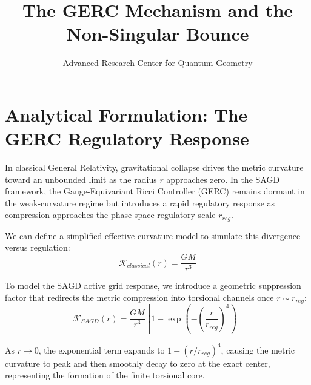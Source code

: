 \documentclass[12pt, a4paper]{article}
\title{\textbf{The GERC Mechanism and the Non-Singular Bounce}}
\author{Advanced Research Center for Quantum Geometry}
\date{}
\begin{document}
\maketitle

\section*{Analytical Formulation: The GERC Regulatory Response}

In classical General Relativity, gravitational collapse drives the metric curvature toward an unbounded limit as the radius $r$ approaches zero. In the SAGD framework, the Gauge-Equivariant Ricci Controller (GERC) remains dormant in the weak-curvature regime but introduces a rapid regulatory response as compression approaches the phase-space regulatory scale $r_{reg}$.

We can define a simplified effective curvature model to simulate this divergence versus regulation:
\begin{equation}
    \mathcal{K}_{classical}(r) = \frac{G M}{r^3}
\end{equation}

To model the SAGD active grid response, we introduce a geometric suppression factor that redirects the metric compression into torsional channels once $r \sim r_{reg}$:
\begin{equation}
    \mathcal{K}_{SAGD}(r) = \frac{G M}{r^3} \left[ 1 - \exp\left(-\left(\frac{r}{r_{reg}}\right)^4\right) \right]
\end{equation}

As $r \to 0$, the exponential term expands to $1 - (r/r_{reg})^4$, causing the metric curvature to peak and then smoothly decay to zero at the exact center, representing the formation of the finite torsional core.

\vspace{1cm}
\end{document}
